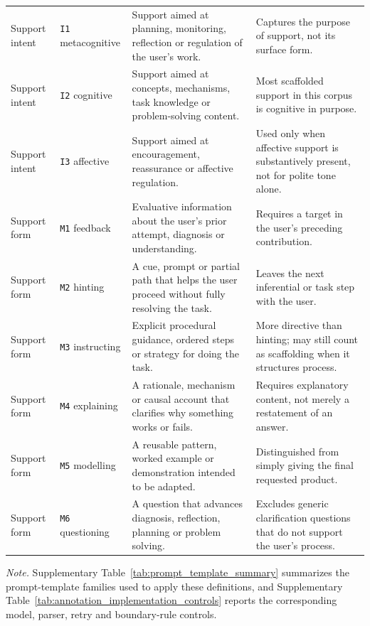 \begin{table}[t]
\begin{tabularx}{\textwidth}{
>{\raggedright\arraybackslash}p{}
>{\raggedright\arraybackslash}p{}
>{\raggedright\arraybackslash}p{}
>{\raggedright\arraybackslash}X}
Support intent & \texttt{I1} metacognitive & Support aimed at planning, monitoring, reflection or regulation of the user's work. & Captures the purpose of support, not its surface form. \\
Support intent & \texttt{I2} cognitive & Support aimed at concepts, mechanisms, task knowledge or problem-solving content. & Most scaffolded support in this corpus is cognitive in purpose. \\
Support intent & \texttt{I3} affective & Support aimed at encouragement, reassurance or affective regulation. & Used only when affective support is substantively present, not for polite tone alone. \\
\midrule
Support form & \texttt{M1} feedback & Evaluative information about the user's prior attempt, diagnosis or understanding. & Requires a target in the user's preceding contribution. \\
Support form & \texttt{M2} hinting & A cue, prompt or partial path that helps the user proceed without fully resolving the task. & Leaves the next inferential or task step with the user. \\
Support form & \texttt{M3} instructing & Explicit procedural guidance, ordered steps or strategy for doing the task. & More directive than hinting; may still count as scaffolding when it structures process. \\
Support form & \texttt{M4} explaining & A rationale, mechanism or causal account that clarifies why something works or fails. & Requires explanatory content, not merely a restatement of an answer. \\
Support form & \texttt{M5} modelling & A reusable pattern, worked example or demonstration intended to be adapted. & Distinguished from simply giving the final requested product. \\
Support form & \texttt{M6} questioning & A question that advances diagnosis, reflection, planning or problem solving. & Excludes generic clarification questions that do not support the user's process. \\
\bottomrule
\end{tabularx}
\vspace{1mm}
\begin{minipage}{0.96\textwidth}
\footnotesize
\textit{Note.} Supplementary Table~\ref{tab:prompt_template_summary} summarizes the prompt-template families used to apply these definitions, and Supplementary Table~\ref{tab:annotation_implementation_controls} reports the corresponding model, parser, retry and boundary-rule controls.
\end{minipage}
\end{table}
